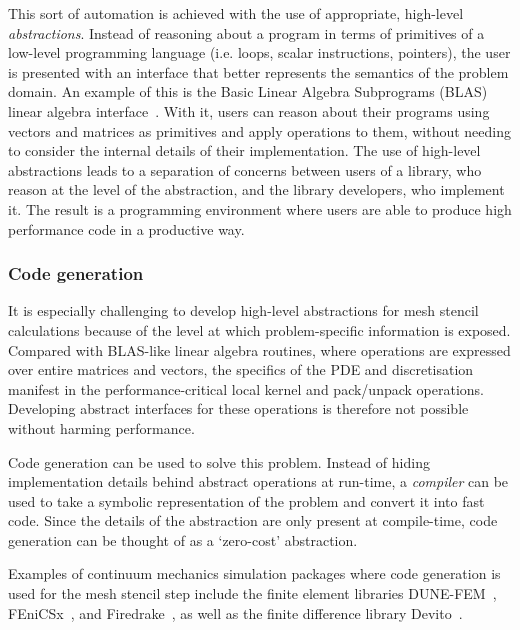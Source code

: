 \documentclass[thesis]{subfiles}
\begin{document}
This sort of automation is achieved with the use of appropriate, high-level \emph{abstractions}.
Instead of reasoning about a program in terms of primitives of a low-level programming language (i.e. loops, scalar instructions, pointers), the user is presented with an interface that better represents the semantics of the problem domain.
An example of this is the Basic Linear Algebra Subprograms (BLAS) linear algebra interface~\cite{lawsonBasicLinearAlgebra1979}.
With it, users can reason about their programs using vectors and matrices as primitives and apply operations to them, without needing to consider the internal details of their implementation.
The use of high-level abstractions leads to a separation of concerns between users of a library, who reason at the level of the abstraction, and the library developers, who implement it. 
The result is a programming environment where users are able to produce high performance code in a productive way.

\subsubsection{Code generation}
\label{sec:intro_software_codegen}

It is especially challenging to develop high-level abstractions for mesh stencil calculations because of the level at which problem-specific information is exposed.
Compared with BLAS-like linear algebra routines, where operations are expressed over entire matrices and vectors, the specifics of the PDE and discretisation manifest in the performance-critical local kernel and pack/unpack operations.
Developing abstract interfaces for these operations is therefore not possible without harming performance.

Code generation can be used to solve this problem.
Instead of hiding implementation details behind abstract operations at run-time, a \emph{compiler} can be used to take a symbolic representation of the problem and convert it into fast code.
Since the details of the abstraction are only present at compile-time, code generation can be thought of as a `zero-cost' abstraction.

Examples of continuum mechanics simulation packages where code generation is used for the mesh stencil step include the finite element libraries DUNE-FEM~\cite{dednerGenericInterfaceParallel2010}, FEniCSx~\cite{barattaDOLFINxNextGeneration2023}, and Firedrake~\cite{FiredrakeUserManual}, as well as the finite difference library Devito~\cite{devito-api,luporiniArchitecturePerformanceDevito2020}.
\end{document}

